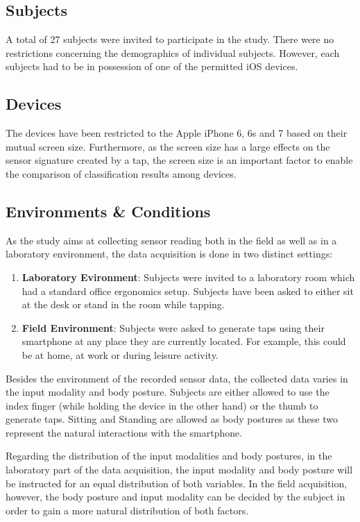 \subsection{Subjects}
A total of 27 subjects were invited to participate in the study. There were no restrictions concerning the demographics of individual subjects. However, each subjects had to be in  possession of one of the permitted iOS devices.

\subsection{Devices}
The devices have been restricted to the Apple iPhone 6, 6s and 7 based on their mutual screen size. Furthermore, as the screen size has a large effects on the sensor signature created by a tap, the screen size is an important factor to enable the comparison of classification results among devices.

\subsection{Environments \& Conditions}
As the study aims at collecting sensor reading both in the field as well as in a laboratory environment, the data acquisition is done in two distinct settings:

\begin{enumerate}
  \item \textbf{Laboratory Evironment}: Subjects were invited to a laboratory room which had a standard office ergonomics setup. Subjects have been asked to either sit at the desk or stand in the room while tapping.
  \item \textbf{Field Environment}: Subjects were asked to generate taps using their smartphone at any place they are currently located. For example, this could be at home, at work or during leisure activity.
\end{enumerate}

Besides the environment of the recorded sensor data, the collected data varies in the input modality and body posture. Subjects are either allowed to use the index finger (while holding the device in the other hand) or the thumb to generate taps. Sitting and Standing are allowed as body postures as these two represent the natural interactions with the smartphone.

Regarding the distribution of the input modalities and body postures, in the laboratory part of the data acquisition, the input modality and body posture will be instructed for an equal distribution of both variables. In the field acquisition, however, the body posture and input modality can be decided by the subject in order to gain a more natural distribution of both factors.

